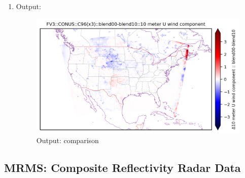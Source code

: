 \documentclass[11pt,fleqn]{report}              %
\begin{document}
\begin{enumerate}
\item Output:

\begin{figure}[ht!]
  \centering
  \includegraphics[width=0.8\linewidth]{fv3_out_comp_CONUS_C96_10u.png}
  \caption{Output: comparison}
  \label{fig:py_out_comp}
\end{figure}

\end{enumerate}




\subsection{MRMS: Composite Reflectivity Radar Data}
\label{subsec:python_mrms}
\end{document}
